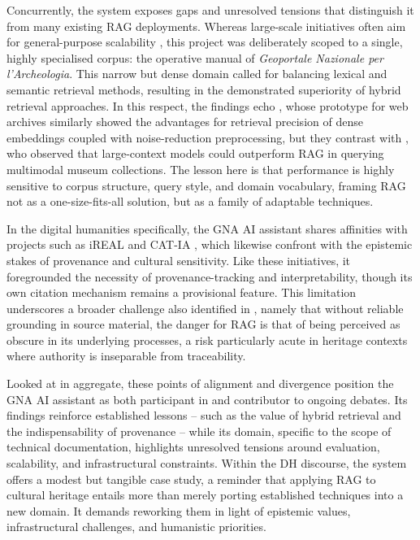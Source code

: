 \begin{spacing}{1.5}
Concurrently, the system exposes gaps and unresolved tensions that distinguish it from many existing RAG deployments. Whereas large-scale initiatives often aim for general-purpose scalability \citep{ramos-varela_context_2025,lala_paperqa_2023}, this project was deliberately scoped to a single, highly specialised corpus: the operative manual of \textit{Geoportale Nazionale per l’Archeologia}. This narrow but dense domain called for balancing lexical and semantic retrieval methods, resulting in the demonstrated superiority of hybrid retrieval approaches. In this respect, the findings echo \citet{davis_unlocking_2025}, whose prototype for web archives similarly showed the advantages for retrieval precision of dense embeddings coupled with noise-reduction preprocessing, but they contrast with \citet{ramos-varela_context_2025}, who observed that large-context models could outperform RAG in querying multimodal museum collections. The lesson here is that performance is highly sensitive to corpus structure, query style, and domain vocabulary, framing RAG not as a one-size-fits-all solution, but as a family of adaptable techniques.

In the digital humanities specifically, the GNA AI assistant shares affinities with projects such as iREAL \citep{callaghan_prototyping_2025} and CAT-IA \citep{barbato_nasce_2025}, which likewise confront with the epistemic stakes of provenance and cultural sensitivity. Like these initiatives, it foregrounded the necessity of provenance-tracking and interpretability, though its own citation mechanism remains a provisional feature. This limitation underscores a broader challenge also identified in \citet{pollin_workshop_2024}, namely that without reliable grounding in source material, the danger for RAG is that of being perceived as obscure in its underlying processes, a risk particularly acute in heritage contexts where authority is inseparable from traceability.

Looked at in aggregate, these points of alignment and divergence position the GNA AI assistant as both participant in and contributor to ongoing debates. Its findings reinforce established lessons -- such as the value of hybrid retrieval and the indispensability of provenance -- while its domain, specific to the scope of technical documentation, highlights unresolved tensions around evaluation, scalability, and infrastructural constraints. Within the DH discourse, the system offers a modest but tangible case study, a reminder that applying RAG to cultural heritage entails more than merely porting established techniques into a new domain. It demands reworking them in light of epistemic values, infrastructural challenges, and humanistic priorities.


\end{spacing}
